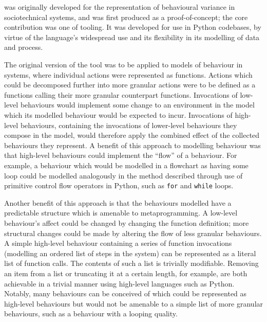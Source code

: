 \pdsf{} was originally developed for the representation of behavioural variance
in sociotechnical systems, and was first produced as a proof-of-concept; the
core contribution was one of tooling. It was developed for use in Python
codebases, by virtue of the language's widespread use and its flexibility in its
modelling of data and process.

The original version of the tool was to be applied to models of behaviour in
\sociotechnical systems, where individual actions were represented as functions.
Actions which could be decomposed further into more granular actions were to be
defined as a functions calling their more granular counterpart functions.
Invocations of low-level behaviours would implement some change to an
environment in the model which its modelled behaviour would be expected to
incur. Invocations of high-level behaviours, containing the invocations of
lower-level behaviours they compose in the model, would therefore apply the
combined effect of the collected behaviours they represent. A benefit of this
approach to modelling behaviour was that high-level behaviours could implement
the ``flow'' of a behaviour. For example, a behaviour which would be modelled in
a flowchart as having some loop could be modelled analogously in the method
described through use of primitive control flow operators in Python, such as
\lstinline{for} and \lstinline{while} loops.

Another benefit of this approach is that the behaviours modelled have a
predictable structure which is amenable to metaprogramming. A low-level
behaviour's affect could be changed by changing the function definition; more
structural changes could be made by altering the flow of less granular
behaviours. A simple high-level behaviour containing a series of function
invocations (modelling an ordered list of steps in the \sociotechnical system)
can be represented as a literal list of function calls. The contents of such a
list is trivially modifiable. Removing an item from a list or truncating it at a
certain length, for example, are both achievable in a trivial manner using
high-level languages such as Python. Notably, many behaviours can be conceived
of which could be represented as high-level behaviours but would not be amenable
to a simple list of more granular behaviours, such as a behaviour with a looping
quality. 


